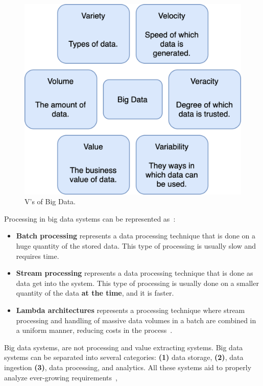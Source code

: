 \begin{figure}[H]
	\begin{center}
		\includegraphics[scale=0.7]{images/Figure3.png}
	\end{center}
	\vspace{-0.6cm}
	\caption{V's of Big Data.}
	\label{fig:fig3}
\end{figure}

\noindent
Processing in big data systems can be represented as~\cite{phdthesis, KiranMMDB15}:

\begin{itemize}
	\item \textbf{Batch processing} represents a data processing technique that is done on a huge quantity of the stored data. This type of processing is usually slow and requires time.
	\item \textbf{Stream processing} represents a data processing technique that is done as data get into the system. This type of processing is usually done on a smaller quantity of the data \textbf{at the time}, and it is faster.
	\item \textbf{Lambda architectures} represents a processing technique where stream processing and handling of massive data volumes in a batch are combined in a uniform manner, reducing costs in the process~\cite{KiranMMDB15}.
\end{itemize}

\noindent
Big data systems, are not processing and value extracting systems. Big data systems can be separated into several categories: \textbf{(1)} data storage, \textbf{(2)}, data ingestion \textbf{(3)}, data processing, and analytics. All these systems aid to properly analyze ever-growing requirements~\cite{RaoMBG19},

